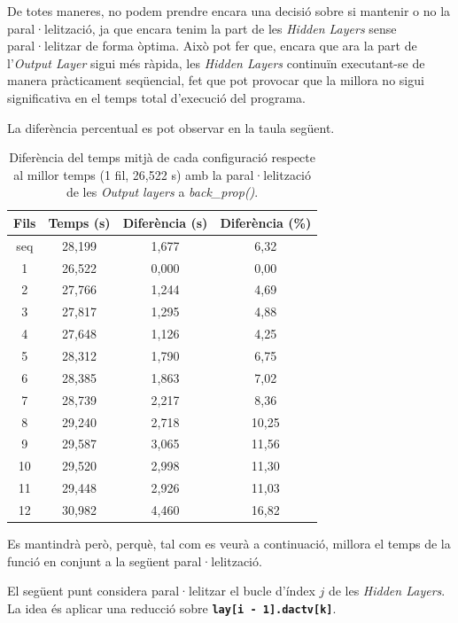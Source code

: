 \documentclass{article}
\begin{document}
\bigskip

\noindent De totes maneres, no podem prendre encara una decisió sobre si mantenir o no la paral·lelització, ja que encara tenim la part de les \textit{Hidden Layers} sense paral·lelitzar de forma òptima. Això pot fer que, encara que ara la part de l'\textit{Output Layer} sigui més ràpida, les \textit{Hidden Layers} continuïn executant-se de manera pràcticament seqüencial, fet que pot provocar que la millora no sigui significativa en el temps total d'execució del programa.

\bigskip

\noindent La diferència percentual es pot observar en la taula següent.


\begin{table}[H]
\centering
\begin{tabular}{|c|c|c|c|}
\hline
\textbf{Fils} & \textbf{Temps (s)} & \textbf{Diferència (s)} & \textbf{Diferència (\%)} \\ \hline
seq & 28,199 & 1,677 & 6,32 \\ \hline
1 & 26,522 & 0,000 & 0,00 \\ \hline
2 & 27,766 & 1,244 & 4,69 \\ \hline
3 & 27,817 & 1,295 & 4,88 \\ \hline
4 & 27,648 & 1,126 & 4,25 \\ \hline
5 & 28,312 & 1,790 & 6,75 \\ \hline
6 & 28,385 & 1,863 & 7,02 \\ \hline
7 & 28,739 & 2,217 & 8,36 \\ \hline
8 & 29,240 & 2,718 & 10,25 \\ \hline
9 & 29,587 & 3,065 & 11,56 \\ \hline
10 & 29,520 & 2,998 & 11,30 \\ \hline
11 & 29,448 & 2,926 & 11,03 \\ \hline
12 & 30,982 & 4,460 & 16,82 \\ \hline
\end{tabular}
\caption{Diferència del temps mitjà de cada configuració respecte al millor temps (1 fil, 26,522 s) amb la paral·lelització de les \textit{Output layers} a \textit{back\_prop()}.}
\label{tab:dif_millor_bp_out}
\end{table}



Es mantindrà però, perquè, tal com es veurà a continuació, millora el temps de la funció en conjunt a la següent paral·lelització.

El següent punt considera paral·lelitzar el bucle d'índex $j$ de les \textit{Hidden Layers}. La idea és aplicar una reducció sobre \textbf{\texttt{lay[i - 1].dactv[k]}}.
\end{document}
